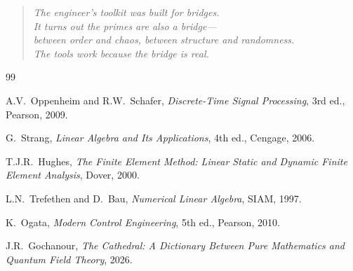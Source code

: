 \documentclass[11pt,a4paper]{article}
\begin{document}
\begin{quote}
\emph{The engineer's toolkit was built for bridges.\\
It turns out the primes are also a bridge---\\
between order and chaos, between structure and randomness.\\
The tools work because the bridge is real.}
\end{quote}

\vspace{0.5cm}

\begin{thebibliography}{99}

A.V.~Oppenheim and R.W.~Schafer, \emph{Discrete-Time Signal
Processing}, 3rd ed., Pearson, 2009.

G.~Strang, \emph{Linear Algebra and Its Applications}, 4th ed.,
Cengage, 2006.

T.J.R.~Hughes, \emph{The Finite Element Method: Linear Static and
Dynamic Finite Element Analysis}, Dover, 2000.

L.N.~Trefethen and D.~Bau, \emph{Numerical Linear Algebra}, SIAM,
1997.

K.~Ogata, \emph{Modern Control Engineering}, 5th ed., Pearson, 2010.

J.R.~Gochanour, \emph{The Cathedral: A Dictionary Between Pure
Mathematics and Quantum Field Theory}, 2026.

\end{thebibliography}
\end{document}
